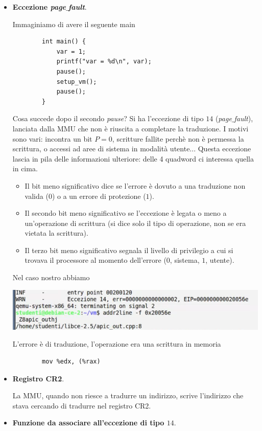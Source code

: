 \begin{itemize}
	\item \textbf{Eccezione \emph{page$\_$fault}}. 
	
	Immaginiamo di avere il seguente main
	\begin{verbatim} 
		int main() {
			var = 1;
			printf("var = %d\n", var);
			pause();
			setup_vm();
			pause();
		}			
	\end{verbatim} 
	Cosa succede dopo il secondo \emph{pause}? Si ha l'eccezione di tipo $14$ (\emph{page$\_$fault}), lanciata dalla MMU che non è riuscita a completare la traduzione. I motivi sono vari: incontra un bit $P=0$, scritture fallite perchè non è permessa la scrittura, o accessi ad aree di sistema in modalità utente...  Questa eccezione lascia in pila delle informazioni ulteriore: delle 4 quadword ci interessa quella in cima.
	\begin{itemize}
		\item Il bit meno significativo dice se l'errore è dovuto a una traduzione non valida ($0$) o a un errore di protezione ($1$).
		\item Il secondo bit meno significativo se l'eccezione è legata o meno a un'operazione di scrittura (si dice solo il tipo di operazione, non se era vietata la scrittura).
		\item Il terzo bit meno significativo segnala il livello di privilegio a cui si trovava il processore al momento dell'errore ($0$, sistema, $1$, utente). 
	\end{itemize} 
	Nel caso nostro abbiamo 
	
	\begin{center}
		\includegraphics[scale=.8]{img/229.PNG}
	\end{center}
	L'errore è di traduzione, l'operazione era una scrittura in memoria
	\begin{verbatim}
		mov %edx, (%rax)
	\end{verbatim}
	\item \textbf{Registro CR2}.
	
	La MMU, quando non riesce a tradurre un indirizzo, scrive l'indirizzo che stava cercando di tradurre nel registro CR2.
	
	\item \textbf{Funzione da associare all'eccezione di tipo $14$}.
	

\end{itemize}
